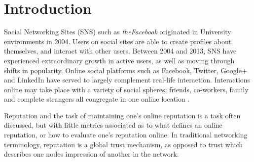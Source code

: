 \chapter{Introduction}\label{C:int}

Social Networking Sites (SNS) such as \textit{theFacebook} originated in University environments in 2004. Users on social sites are able to create profiles about themselves, and interact with other users. Between 2004 and 2013, SNS have experienced extraordinary growth in active users, as well as moving through shifts in popularity. Online social platforms such as Facebook, Twitter, Google+ and LinkedIn have served to largely complement real-life interaction. Interactions online may take place with a variety of social spheres; friends, co-workers, family and complete strangers all congregate in one online location \cite{johnson2012facebook}.

Reputation and the task of maintaining one's online reputation is a task often discussed, but with little metrics associated as to what defines an online reputation, or how to evaluate one's reputation online. In traditional networking terminology, reputation is a global trust mechanism, as opposed to trust which describes one nodes impression of another in the network. 











